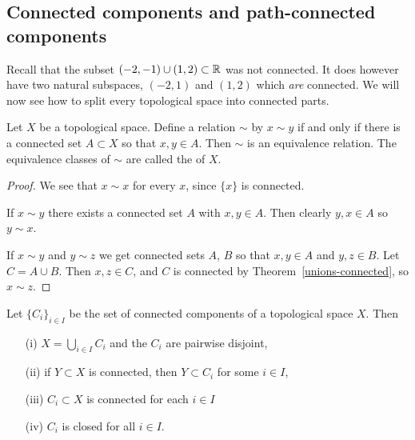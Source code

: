 \subsection{Connected components and path-connected components}
Recall that the subset $(-2,-1) \cup (1,2) \subset \mathbb{R}$ was not connected. It does however have two natural subspaces, $(-2,1)$ and $(1,2)$ which \emph{are} connected. We will now see how to split every topological space into connected parts.

\begin{prop}
  Let $X$ be a topological space. Define a relation $\sim$ by $x \sim y$ if and only if there is a connected set $A \subset X$ so that $x,y \in A$. Then $\sim$ is an equivalence relation. The equivalence classes of $\sim$ are called the  of $X$.
\end{prop}
\begin{proof}
  We see that $x \sim x$ for every $x$, since $\{x\}$ is connected.
  
  If $x \sim y$ there exists a connected set $A$ with $x,y \in A$. Then clearly $y,x \in A$ so $y \sim x$.
  
  If $x \sim y$ and $y \sim z$ we get connected sets $A$, $B$ so that $x,y \in A$ and $y,z \in B$. Let $C = A \cup B$. Then $x,z \in C$, and $C$ is connected by Theorem~\ref{unions-connected}, so $x \sim z$.
\end{proof}
\begin{prop}
  \label{props-of-conn-components}
  Let $\{C_i\}_{i \in I}$ be the set of connected components of a topological space $X$. Then
  \begin{itemize}
    \item[(i)] $X = \bigcup_{i \in I} C_i$ and the $C_i$ are pairwise disjoint,
    \item[(ii)] if $Y \subset X$ is connected, then $Y \subset C_i$ for some $i \in I$,
    \item[(iii)] $C_i \subset X$ is connected for each $i \in I$
    \item[(iv)] $C_i$ is closed for all $i \in I$.
  \end{itemize}
\end{prop}
